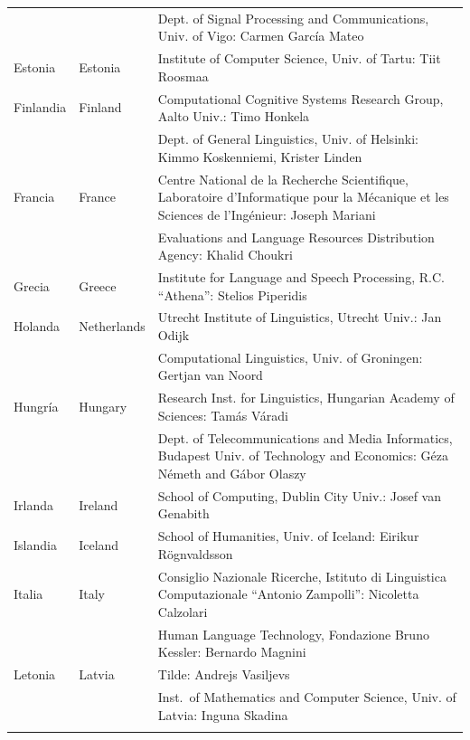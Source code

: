 \begin{longtable}{@{}llp{113mm}@{}}
  & & Dept. of Signal Processing and Communications, Univ. of Vigo: Carmen García Mateo \\ \addlinespace 
  Estonia & \textcolor{grey1}{Estonia} & Institute of Computer Science, Univ. of Tartu: Tiit Roosmaa \\ \addlinespace
  Finlandia & \textcolor{grey1}{Finland} & Computational Cognitive Systems Research Group, Aalto Univ.: Timo Honkela \\ \addlinespace
  & & Dept. of General Linguistics, Univ. of Helsinki: Kimmo Koskenniemi, Krister Linden \\ \addlinespace
  Francia & \textcolor{grey1}{France} & Centre National de la Recherche Scientifique, Laboratoire d'Informatique pour la Mécanique et les Sciences de l'Ingénieur: Joseph Mariani \\ \addlinespace
  & & Evaluations and Language Resources Distribution Agency: Khalid Choukri \\ \addlinespace 
  Grecia & \textcolor{grey1}{Greece} & Institute for Language and Speech Processing, R.C. “Athena”: Stelios Piperidis \\ \addlinespace
  Holanda & \textcolor{grey1}{Netherlands} & Utrecht Institute of Linguistics, Utrecht Univ.: Jan Odijk \\ \addlinespace 
  & & Computational Linguistics, Univ. of Groningen: Gertjan van Noord \\ \addlinespace
  Hungría & \textcolor{grey1}{Hungary} & Research Inst. for Linguistics, Hungarian Academy of Sciences: Tamás Váradi \\  \addlinespace
  & & Dept. of Telecommunications and Media Informatics, Budapest Univ. of Technology and Economics: Géza Németh and Gábor Olaszy \\ \addlinespace
  Irlanda & \textcolor{grey1}{Ireland} & School of Computing, Dublin City Univ.: Josef van Genabith \\ \addlinespace
  Islandia & \textcolor{grey1}{Iceland} & School of Humanities, Univ. of Iceland: Eirikur Rögnvaldsson \\ \addlinespace
  Italia & \textcolor{grey1}{Italy} & Consiglio Nazionale Ricerche, Istituto di Linguistica Computazionale “Antonio Zampolli”: Nicoletta Calzolari \\ \addlinespace
  & & Human Language Technology, Fondazione Bruno Kessler: Bernardo Magnini \\ \addlinespace 
  Letonia & \textcolor{grey1}{Latvia} & Tilde: Andrejs Vasiljevs \\ \addlinespace 
  & & Inst.~of Mathematics and Computer Science, Univ. of Latvia: Inguna Skadina\\ \addlinespace

\end{longtable}
